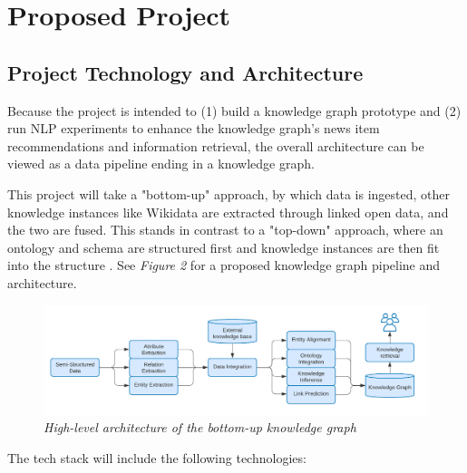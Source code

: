 \documentclass[11pt]{article}
\begin{document}
\newpage
\section{Proposed Project}
\label{sec:ProposedProject}
\subsection{Project Technology and Architecture}
Because the project is intended to (1) build a knowledge graph prototype and (2) run NLP experiments to enhance the knowledge graph's news item recommendations and information retrieval, the overall architecture can be viewed as a data pipeline ending in a knowledge graph.

This project will take a "bottom-up" approach, by which data is ingested, other knowledge instances like Wikidata are extracted through linked open data, and the two are fused. This stands in contrast to a "top-down" approach, where an ontology and schema are structured first and knowledge instances are then fit into the structure \cite{zhao2018architecture}. See \textit{Figure 2} for a proposed knowledge graph pipeline and architecture.

\begin{figure}
\centerline{\includegraphics[scale=0.275]{bottom-up-kg-architecture}}
\caption{\textit{High-level architecture of the bottom-up knowledge graph}}
\label{figure:BottomUpKGArchitecture}
\end{figure}

The tech stack will include the following technologies:
\end{document}
